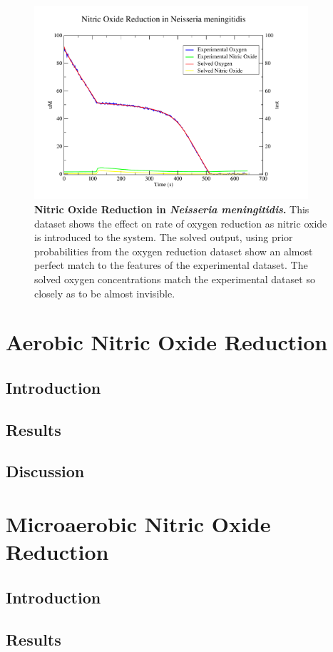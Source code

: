 \begin{figure}[ht!]
 \centering
 \includegraphics[width=4in]{./06-noreduction/data/nosim.pdf}
 \caption{\footnotesize {\bf Nitric Oxide Reduction in \textit{Neisseria meningitidis}.} This dataset shows the effect on rate of oxygen reduction as nitric oxide is introduced to the system. The solved output, using prior probabilities from the oxygen reduction dataset show an almost perfect match to the features of the experimental dataset. The solved oxygen concentrations match the experimental dataset so closely as to be almost invisible.}
 \label{fig:nosim}
\end{figure}

\section{Aerobic Nitric Oxide Reduction}
\subsection{Introduction}
\subsection{Results}
\subsection{Discussion}
\section{Microaerobic Nitric Oxide Reduction}
\subsection{Introduction}
\subsection{Results}
